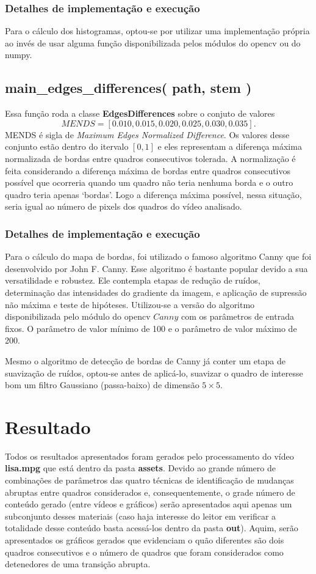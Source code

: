 \documentclass{article}
\begin{document}
\subsubsection{Detalhes de implementação e execução}
Para o cálculo dos histogramas, optou-se por utilizar uma implementação própria ao invés de usar alguma função disponibilizada pelos módulos do opencv ou do numpy.


%
\subsection{main\_edges\_differences( path, stem )}
Essa função roda a classe \textbf{EdgesDifferences} sobre o conjuto de valores
\[
    MENDS = [0.010, 0.015, 0.020, 0.025, 0.030, 0.035].
\]
MENDS é sigla de \textit{Maximum Edges Normalized Difference}. Os valores desse conjunto estão dentro do itervalo $[0,1]$ e eles representam a diferença máxima normalizada de bordas entre quadros consecutivos tolerada. A normalização é feita considerando a diferença máxima de bordas entre quadros consecutivos possível que ocorreria quando um quadro não teria nenhuma borda e o outro quadro teria apenas `bordas'. Logo a diferença máxima possível, nessa situação, seria igual ao número de pixels dos quadros do vídeo analisado.


%
\subsubsection{Detalhes de implementação e execução}
Para o cálculo do mapa de bordas, foi utilizado o famoso algoritmo Canny que foi desenvolvido por John F. Canny. Esse algoritmo é bastante popular devido a sua versatilidade e robustez. Ele contempla etapas de redução de ruídos, determinação das intensidades do gradiente da imagem, e aplicação de supressão não máxima e teste de hipóteses. Utilizou-se a versão do algoritmo disponibilizada pelo módulo do opencv $Canny$ com os parâmetros de entrada fixos. O parâmetro de valor mínimo de 100 e o parâmetro de valor máximo de 200. 

Mesmo o algoritmo de detecção de bordas de Canny já conter um etapa de suavização de ruídos, optou-se antes de aplicá-lo, suavizar o quadro de interesse bom um filtro Gaussiano (passa-baixo) de dimensão $5\times5$.


\section{Resultado}
Todos os resultados apresentados foram gerados pelo processamento do vídeo \textbf{lisa.mpg} que está dentro da pasta \textbf{assets}. Devido ao grande número de combinações de parâmetros das quatro técnicas de identificação de mudanças abruptas entre quadros considerados e, consequentemente, o grade número de conteúdo gerado (entre vídeos e gráficos) serão apresentados aqui apenas um subconjunto desses materiais (caso haja interesse do leitor em verificar a totalidade desse conteúdo basta acessá-los dentro da pasta \textbf{out}). Aquim, serão apresentados os gráficos gerados que evidenciam o quão diferentes são dois quadros consecutivos e o número de quadros que foram considerados como detenedores de uma transição abrupta.
\end{document}
